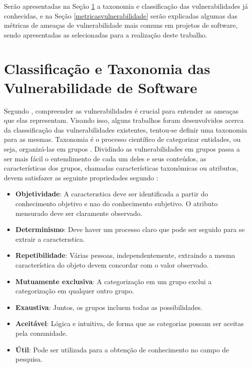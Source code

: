 Serão apresentadas na Seção \ref{cwe} a taxonomia e classificação das
vulnerabilidades já conhecidas, e na Seção \ref{metricasvulnerabilidade} serão
explicadas algumas das métricas de ameaças de vulnerabilidade mais comuns em
projetos de software, sendo apresentadas as selecionadas para a realização deste
trabalho.

\section{Classificação e Taxonomia das Vulnerabilidade de Software}\label{cwe}

Segundo , compreender as vulnerabilidades é
crucial para entender as ameaças que elas representam. Visando isso, alguns
trabalhos foram desenvolvidos acerca da classsificação das vulnerabilidades
existentes, tentou-se definir uma taxonomia para as mesmas. Taxonomia é o
processo científico de categorizar entidades, ou seja, organizá-las em grupos
\cite{gregio:2005}. Dividindo as vulnerabilidades em grupos passa a ser mais
fácil o entendimento de cada um deles e seus conteúdos, as características dos
grupos, chamadas características taxonômicas ou atributos, devem satisfazer as
seguinte propriedades segundo : 

\begin{itemize}
  \item \textbf{Objetividade}: A caracterıstica deve ser identificada a partir
    do conhecimento objetivo e nao do conhecimento subjetivo.  O atributo
    mensurado deve ser claramente observado.

  \item \textbf{Determinismo}: Deve haver um processo claro que pode ser seguido
    para se extrair a caracterıstica.

  \item \textbf{Repetibilidade}: Várias pessoas, independentemente, extraindo a
    mesma característica do objeto devem concordar com o valor observado.

  \item \textbf{Mutuamente exclusiva}: A categorização em um grupo exclui a
    categorização em qualquer outro grupo.

  \item \textbf{Exaustiva}: Juntos, os grupos incluem todas as possibilidades.

  \item \textbf{Aceitável}: Lógica e intuitiva, de forma que as categorias
    possam ser aceitas pela comunidade.

  \item \textbf{Útil}: Pode ser utilizada para a obtenção de conhecimento no
    campo de pesquisa.
\end{itemize}

